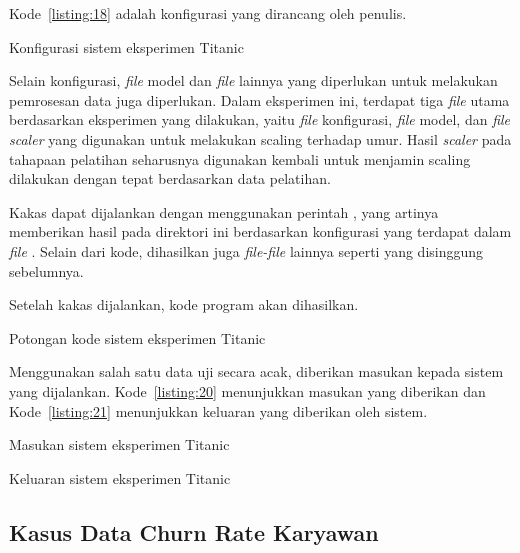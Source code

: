 Kode~\ref{listing:18} adalah konfigurasi yang dirancang oleh penulis.

\begin{code}
	\caption{Konfigurasi sistem eksperimen Titanic}\label{listing:18}
\end{code}

Selain konfigurasi, \textit{file} model dan \textit{file} lainnya yang diperlukan untuk melakukan pemrosesan data juga diperlukan.
Dalam eksperimen ini, terdapat tiga \textit{file} utama berdasarkan eksperimen yang dilakukan, yaitu \textit{file} konfigurasi, \textit{file} model, dan \textit{file scaler}  yang digunakan untuk melakukan scaling terhadap umur.
Hasil \textit{scaler} pada tahapaan pelatihan seharusnya digunakan kembali untuk menjamin scaling dilakukan dengan tepat berdasarkan data pelatihan.

Kakas dapat dijalankan dengan menggunakan perintah , yang artinya memberikan hasil pada direktori ini berdasarkan konfigurasi yang terdapat dalam \textit{file} .
Selain dari kode, dihasilkan juga \textit{file-file} lainnya seperti yang disinggung sebelumnya.

Setelah kakas dijalankan, kode program akan dihasilkan.

\begin{code}
	\caption{Potongan kode sistem eksperimen Titanic}\label{listing:19}
\end{code}

Menggunakan salah satu data uji secara acak, diberikan masukan kepada sistem yang dijalankan.
Kode~\ref{listing:20} menunjukkan masukan yang diberikan dan Kode~\ref{listing:21} menunjukkan keluaran yang diberikan oleh sistem.

\begin{code}
	\caption{Masukan sistem eksperimen Titanic}\label{listing:20}
\end{code}

\begin{code}
	\caption{Keluaran sistem eksperimen Titanic}\label{listing:21}
\end{code}

\subsection{Kasus Data Churn Rate Karyawan}

